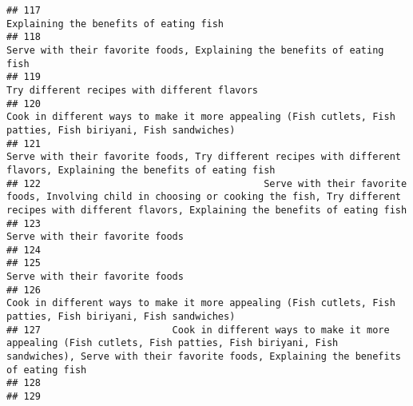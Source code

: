 \documentclass[
]{article}
\begin{document}
\begin{verbatim}
## 117                                                                                                                                                                       Explaining the benefits of eating fish
## 118                                                                                                                                      Serve with their favorite foods, Explaining the benefits of eating fish
## 119                                                                                                                                                                 Try different recipes with different flavors
## 120                                                                                                Cook in different ways to make it more appealing (Fish cutlets, Fish patties, Fish biriyani, Fish sandwiches)
## 121                                                                                        Serve with their favorite foods, Try different recipes with different flavors, Explaining the benefits of eating fish
## 122                                       Serve with their favorite foods, Involving child in choosing or cooking the fish, Try different recipes with different flavors, Explaining the benefits of eating fish
## 123                                                                                                                                                                              Serve with their favorite foods
## 124                                                                                                                                                                                                             
## 125                                                                                                                                                                              Serve with their favorite foods
## 126                                                                                                Cook in different ways to make it more appealing (Fish cutlets, Fish patties, Fish biriyani, Fish sandwiches)
## 127                       Cook in different ways to make it more appealing (Fish cutlets, Fish patties, Fish biriyani, Fish sandwiches), Serve with their favorite foods, Explaining the benefits of eating fish
## 128                                                                                                                                                                                                             
## 129                                                                                                                                                                                                             

\end{verbatim}
\end{document}
